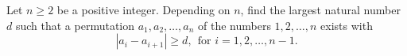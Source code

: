 Let $n\ge 2$ be a positive integer. Depending on $n$, find the largest natural number $d$ such
that a permutation $a_1,a_2,\dots,a_n$ of the numbers $1,2,\dots,n$ exists with 
$$|a_i-a_{i+1}| \geq d, \ \ \text{for }i=1,2,\dots,n-1.$$